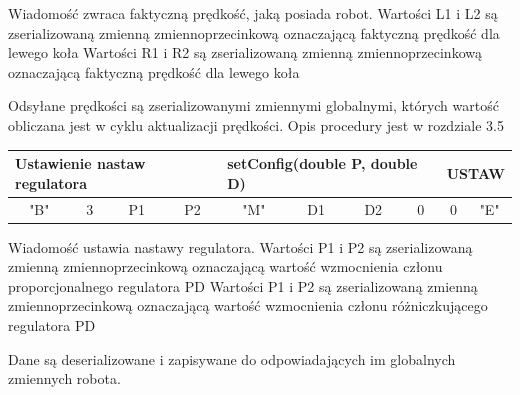 \documentclass[eng,printmode]{mgr}
\begin{document}
Wiadomość zwraca faktyczną prędkość, jaką posiada robot. 
Wartości L1 i L2 są zserializowaną zmienną zmiennoprzecinkową oznaczającą faktyczną prędkość dla lewego koła
Wartości R1 i R2 są zserializowaną zmienną zmiennoprzecinkową oznaczającą faktyczną prędkość dla lewego koła 

Odsyłane prędkości są zserializowanymi zmiennymi globalnymi, których wartość obliczana  jest w cyklu aktualizacji prędkości. Opis procedury jest w rozdziale 3.5

\begin{table}[!htb]
\centering
\begin{adjustbox}{width=1\textwidth}
\label{my-label}
\begin{tabular}{|c|c|c|c|c|c|c|c|c|c|}
\hline
\multicolumn{4}{|l|}{Ustawienie nastaw regulatora } & \multicolumn{4}{l|}{setConfig(double P, double D)} & \multicolumn{2}{l|}{USTAW} \\ \hline
"B" \hspace{1em}             & 3\hspace{2em}              & P1\hspace{2em}              & P2\hspace{2em}         & "M"\hspace{2em}         & D1\hspace{2em}         & D2\hspace{2em}         & 0\hspace{2em}         & 0\hspace{2em}          & "E"\hspace{2em}          \\ \hline
\end{tabular}
\end{adjustbox}
\end{table}

Wiadomość ustawia nastawy regulatora. 
Wartości P1 i P2 są zserializowaną zmienną zmiennoprzecinkową oznaczającą wartość wzmocnienia członu proporcjonalnego regulatora PD
Wartości P1 i P2 są zserializowaną zmienną zmiennoprzecinkową oznaczającą wartość wzmocnienia członu różniczkującego regulatora PD

Dane są deserializowane i zapisywane do odpowiadających im globalnych zmiennych robota.
\end{document}
